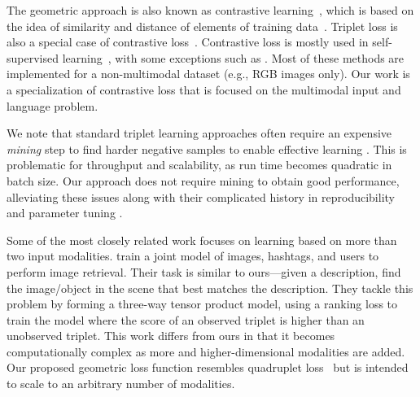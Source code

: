 \documentclass[sigconf,natbib=true,anonymous=true]{acmart}
\begin{document}
The geometric approach is also known as contrastive learning~\citep{qin2021world}, which is based on the idea of similarity and distance of elements of training data~\citep{Carvalho-cooking-triplet,triplet_loss_2021_CVPR,salvador2017cooking}. Triplet loss is also a special case of contrastive loss~\citep{NEURIPS2020_supervised_contrastive}. Contrastive loss is mostly used in self-supervised learning~\citep{bui2021self, alayrac2020self,chen2020simple}, with some exceptions such as \citet{NEURIPS2020_supervised_contrastive}. Most of these methods are implemented for a non-multimodal dataset (e.g., RGB images only). Our work is a specialization of contrastive loss that is focused on the multimodal input and language problem.

We note that standard triplet learning approaches often require an expensive \textit{mining} step to find harder negative samples to enable effective learning \citep{Hoffer2015,Schroff2015,DBLP:conf/eccv/2018-9,DBLP:conf/eccv/ZhaoJQLH18,Zhai2018}. This is problematic for throughput and scalability, as run time becomes quadratic in batch size. Our approach does not require mining to obtain good performance, alleviating these issues along with their complicated history in reproducibility and parameter tuning \citep{Musgrave2020,Raff2020c,Raff2019_quantify_repro}. 

Some of the most closely related work focuses on learning based on more than two input modalities. \citet{Veit_2018_CVPR} train a joint model of images, hashtags, and users to perform image retrieval. Their task is similar to ours---given a description, find the image/object in the scene that best matches the description. They tackle this problem by forming a three-way tensor product model, using a ranking loss to train the model where the score of an observed triplet is higher than an unobserved triplet. 
This work differs from ours in that it becomes computationally complex as more and higher-dimensional modalities are added.
Our proposed geometric loss function resembles quadruplet loss~\citep{chen2017beyond,tursun2021efficient} but is intended to scale to an arbitrary number of modalities.
\end{document}
